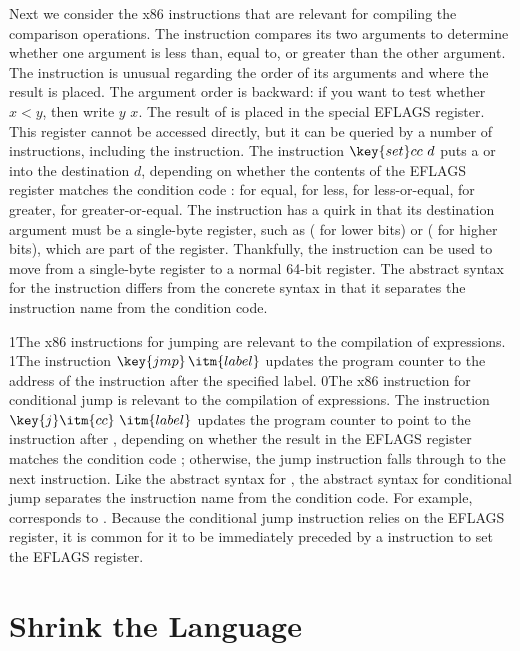 \documentclass[7x10]{TimesAPriori_MIT}%
\def\racketEd{0}
\def\pythonEd{1}
\def\edition{1}
\newcommand{\racket}[1]{{\if\edition\racketEd{#1}\fi}}
\newcommand{\pythonColor}[0]{}
\newcommand{\python}[1]{{\if\edition\pythonEd\pythonColor #1\fi}}
\numberwithin{theorem}{chapter}
\numberwithin{definition}{chapter}
\numberwithin{equation}{chapter}
\begin{document}
Next we consider the x86 instructions that are relevant for compiling
the comparison operations. The  instruction compares its two
arguments to determine whether one argument is less than, equal to, or
greater than the other argument. The  instruction is unusual
regarding the order of its arguments and where the result is
placed. The argument order is backward: if you want to test whether
$x < y$, then write  $y$\code{,} $x$. The result of
 is placed in the special EFLAGS register. This register
cannot be accessed directly, but it can be queried by a number of
instructions, including the  instruction. The instruction
$\key{set}cc~d$ puts a  or  into the destination $d$,
depending on whether the contents of the EFLAGS register matches the
condition code :  for equal,  for less, 
for less-or-equal,  for greater,  for greater-or-equal.
The  instruction has a quirk in that its destination argument
must be a single-byte register, such as  ( for lower bits) or
 ( for higher bits), which are part of the 
register.  Thankfully, the  instruction can be used to
move from a single-byte register to a normal 64-bit register.  The
abstract syntax for the  instruction differs from the
concrete syntax in that it separates the instruction name from the
condition code.

\python{The x86 instructions for jumping are relevant to the
  compilation of \key{if} expressions.}
%
\python{The instruction $\key{jmp}\,\itm{label}$ updates the program
  counter to the address of the instruction after the specified
  label.}
%
\racket{The x86 instruction for conditional jump is relevant to the
  compilation of \key{if} expressions.}
%
The instruction $\key{j}\itm{cc}~\itm{label}$ updates the program
counter to point to the instruction after , depending on
whether the result in the EFLAGS register matches the condition code
; otherwise, the jump instruction falls through to the next
instruction.  Like the abstract syntax for , the abstract
syntax for conditional jump separates the instruction name from the
condition code. For example, 
corresponds to .  Because the conditional jump instruction
relies on the EFLAGS register, it is common for it to be immediately preceded by
a  instruction to set the EFLAGS register.


\section{Shrink the \LangIf{} Language}
\label{sec:shrink-Lif}
\end{document}
